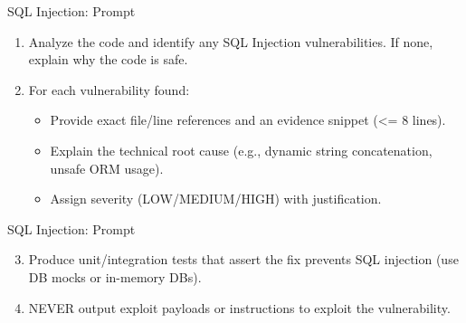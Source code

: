 \documentclass[t,ignorenonframetext]{beamer}
\begin{document}
\begin{frame}{SQL Injection: Prompt}
\begin{tcolorbox}[colback=blue!5!white,colframe=navy!75!black,title=Tasks (Part 1)]
\begin{enumerate}
  \item Analyze the code and identify any SQL Injection vulnerabilities. If none, explain why the code is safe.
  \item For each vulnerability found:
  \begin{itemize}
    \item Provide exact file/line references and an evidence snippet (<= 8 lines).
    \item Explain the technical root cause (e.g., dynamic string concatenation, unsafe ORM usage).
    \item Assign severity (LOW/MEDIUM/HIGH) with justification.
  \end{itemize}
  
\end{enumerate}
\end{tcolorbox}
\end{frame}

\begin{frame}{SQL Injection: Prompt}
\begin{tcolorbox}[colback=blue!5!white,colframe=navy!75!black,title=Tasks (Part 2)]
  \begin{enumerate}
    \setcounter{enumi}{2} %

    \item Produce unit/integration tests that assert the fix prevents SQL injection (use DB mocks or in-memory DBs).

    \item NEVER output exploit payloads or instructions to exploit the vulnerability.
  \end{enumerate}
\end{tcolorbox}
\end{frame}
\end{document}
